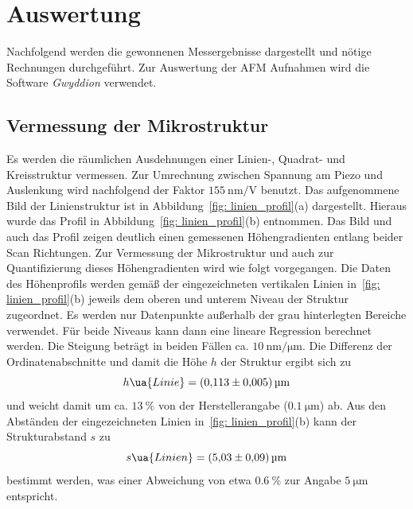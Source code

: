 \section{Auswertung}
Nachfolgend werden die gewonnenen Messergebnisse dargestellt und nötige Rechnungen durchgeführt.
Zur Auswertung der AFM Aufnahmen wird die Software \textit{Gwyddion} verwendet.

\FloatBarrier
\subsection{Vermessung der Mikrostruktur}
Es werden die räumlichen Ausdehnungen einer Linien-, Quadrat- und Kreisstruktur vermessen. 
Zur Umrechnung zwischen Spannung am Piezo und Auslenkung wird nachfolgend der Faktor
$\SI{155}{\nano\meter \per \volt}$ benutzt.
Das aufgenommene Bild der Linienstruktur ist in Abbildung~\ref{fig: linien_profil}(a) dargestellt. Hieraus wurde
das Profil in Abbildung~\ref{fig: linien_profil}(b) entnommen. Das Bild und auch das Profil zeigen deutlich einen gemessenen
Höhengradienten entlang beider Scan Richtungen. Zur Vermessung der Mikrostruktur und auch zur Quantifizierung
dieses Höhengradienten wird wie folgt vorgegangen. Die Daten des Höhenprofils werden gemäß der
eingezeichneten vertikalen Linien in~\ref{fig: linien_profil}(b) jeweils dem oberen und unterem
Niveau der Struktur zugeordnet. Es werden nur Datenpunkte außerhalb der grau hinterlegten Bereiche verwendet.
Für beide Niveaus kann dann eine lineare Regression berechnet werden.
Die Steigung beträgt in beiden Fällen ca. $\SI{10}{\nano\meter\per\micro\meter}$. Die Differenz
der Ordinatenabschnitte und damit die Höhe $h$ der Struktur ergibt sich zu
\begin{equation}
  h\ua{Linie} = \SI{0.113(5)}{\micro\meter}
\end{equation}
und weicht damit um ca. $\SI{13}{\percent}$ von der Herstellerangabe ($\SI{0.1}{\micro\meter}$) ab. Aus den Abständen der eingezeichneten
Linien in~\ref{fig: linien_profil}(b) kann der Strukturabstand $s$ zu
\begin{equation}
  s\ua{Linien} = \SI{5.03(9)}{\micro\meter}
\end{equation}
bestimmt werden, was einer Abweichung von etwa $\SI{0.6}{\percent}$ zur Angabe $\SI{5}{\micro\meter}$ entspricht.
